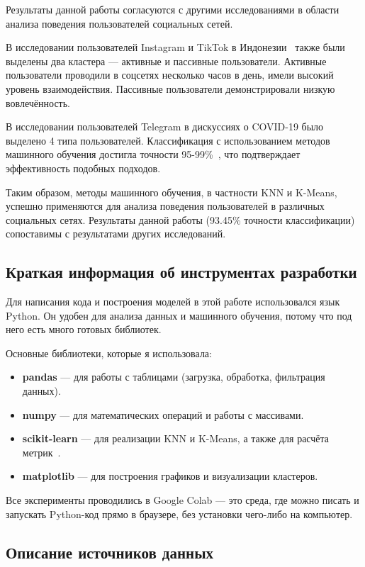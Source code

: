 \documentclass[14pt, a4paper]{extarticle}
\begin{document}
Результаты данной работы согласуются с другими исследованиями в области анализа поведения пользователей социальных сетей.

В исследовании пользователей Instagram и TikTok в Индонезии~\cite{savin2020} также были выделены два кластера — активные и пассивные пользователи. Активные пользователи проводили в соцсетях несколько часов в день, имели высокий уровень взаимодействия. Пассивные пользователи демонстрировали низкую вовлечённость.

В исследовании пользователей Telegram в дискуссиях о COVID-19 было выделено 4 типа пользователей. Классификация с использованием методов машинного обучения достигла точности 95-99\%~\cite{zhdanova2025}, что подтверждает эффективность подобных подходов.

Таким образом, методы машинного обучения, в частности KNN и K-Means, успешно применяются для анализа поведения пользователей в различных социальных сетях. Результаты данной работы (93.45\% точности классификации) сопоставимы с результатами других исследований.

\subsection{Краткая информация об инструментах разработки}

Для написания кода и построения моделей в этой работе использовался язык Python. Он удобен для анализа данных и машинного обучения, потому что под него есть много готовых библиотек.

Основные библиотеки, которые я использовала:

\begin{itemize}
    \item \textbf{pandas} — для работы с таблицами (загрузка, обработка, фильтрация данных).
    \item \textbf{numpy} — для математических операций и работы с массивами.
    \item \textbf{scikit-learn} — для реализации KNN и K-Means, а также для расчёта метрик~\cite{scikit}.
    \item \textbf{matplotlib} — для построения графиков и визуализации кластеров.
\end{itemize}
\smallskip
Все эксперименты проводились в Google Colab — это среда, где можно писать и запускать Python-код прямо в браузере, без установки чего-либо на компьютер.

\subsection{Описание источников данных}
\end{document}
